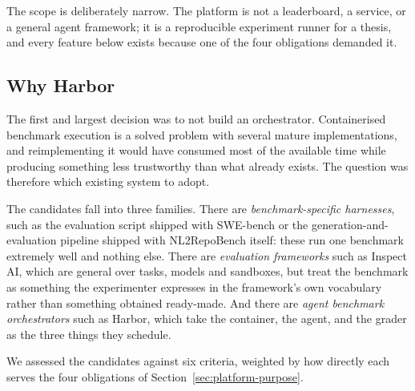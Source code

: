 
The scope is deliberately narrow. The platform is not a leaderboard, a service,
or a general agent framework; it is a reproducible experiment runner for a
thesis, and every feature below exists because one of the four obligations
demanded it.

\subsection{Why Harbor}

The first and largest decision was to not build an orchestrator. Containerised
benchmark execution is a solved problem with several mature implementations,
and reimplementing it would have consumed most of the available time while
producing something less trustworthy than what already exists. The question was
therefore which existing system to adopt.

The candidates fall into three families. There are \emph{benchmark-specific
harnesses}, such as the evaluation script shipped with SWE-bench or the
generation-and-evaluation pipeline shipped with NL2RepoBench itself: these run
one benchmark extremely well and nothing else. There are \emph{evaluation
frameworks} such as Inspect AI, which are general over tasks, models and
sandboxes, but treat the benchmark as something the experimenter expresses in
the framework's own vocabulary rather than something obtained ready-made. And
there are \emph{agent benchmark orchestrators} such
as Harbor, which take the container, the agent, and the grader as the three
things they schedule.

We assessed the candidates against six criteria, weighted by how directly each
serves the four obligations of Section~\ref{sec:platform-purpose}.

